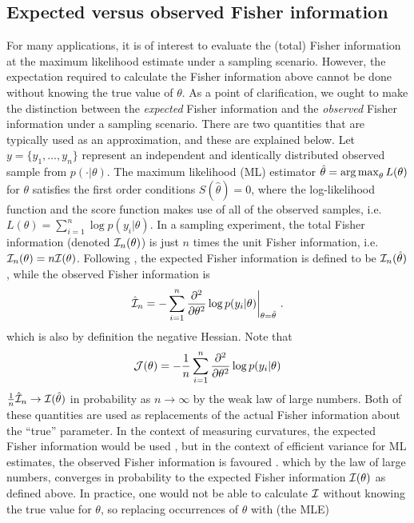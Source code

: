 \subsection{Expected versus observed Fisher information}

For many applications, it is of interest to evaluate the (total) Fisher information at the maximum likelihood estimate under a sampling scenario.
However, the expectation required to calculate the Fisher information above cannot be done without knowing the true value of $\theta$.
As a point of clarification, we ought to make the distinction between the \emph{expected} Fisher information and the \emph{observed} Fisher information under a sampling scenario.
There are two quantities that are typically used as an approximation, and these are explained below.
Let $y = \{y_1,\dots,y_n\}$ represent an independent and identically distributed observed sample from $p(\cdot|\theta)$.
The maximum likelihood (ML) estimator $\hat\theta = \operatorname*{arg\,max}_\theta L(\theta)$ for $\theta$ satisfies the first order conditions $S(\hat\theta) = 0$, where the log-likelihood function and the score function makes use of all of the observed samples, i.e. $L(\theta) = \sum_{i=1}^n \log p(y_i|\theta)$.
In a sampling experiment, the total Fisher information (denoted ${\mathcal I}_n(\theta)$) is just $n$ times the unit Fisher information, i.e. ${\mathcal I}_n(\theta) = n{\mathcal I}(\theta)$.
Following \citet{efron1978assessing}, the expected Fisher information is defined to be ${\mathcal I}_n(\hat\theta)$, while the observed Fisher information is
\[
  \hat{{\mathcal I}}_n = -\sum_{i=1}^n \frac{\partial ^ 2}{\partial\theta^2} \log p(y_i|\theta) \bigg|_{\theta = \hat\theta} \ .
\]
which is also by definition the negative Hessian. 
Note that 
\[
  {\mathcal J}(\theta) = -\frac{1}{n} \sum_{i=1}^n \frac{\partial ^ 2}{\partial\theta^2} \log p(y_i|\theta) 
\]
$\frac{1}{n}\hat{{\mathcal I}}_n \to {\mathcal I}(\hat\theta)$ in probability as $n\to\infty$ by the weak law of large numbers.
Both of these quantities are used as replacements of the actual Fisher information about the ``true'' parameter.
In the context of measuring curvatures, the expected Fisher information would be used \citep{pawitan2001all}, but in the context of efficient variance for ML estimates, the observed Fisher information is favoured \citep{efron1978assessing}.
which by the law of large numbers, converges in probability to the expected Fisher information ${\mathcal I}(\theta)$ as defined above.
In practice, one would not be able to calculate ${\mathcal I}$ without knowing the true value for $\theta$, so replacing occurrences of $\theta$ with  (the MLE)


